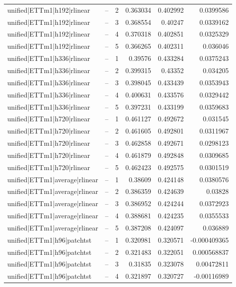 \begin{longtable}{llrrrr}
unified|ETTm1|h192|rlinear & -- & 2 & 0.363034 & 0.402992 & 0.0399586 \\
unified|ETTm1|h192|rlinear & -- & 3 & 0.368554 & 0.40247 & 0.0339162 \\
unified|ETTm1|h192|rlinear & -- & 4 & 0.370318 & 0.402851 & 0.0325329 \\
unified|ETTm1|h192|rlinear & -- & 5 & 0.366265 & 0.402311 & 0.036046 \\
unified|ETTm1|h336|rlinear & -- & 1 & 0.39576 & 0.433284 & 0.0375243 \\
unified|ETTm1|h336|rlinear & -- & 2 & 0.399315 & 0.43352 & 0.034205 \\
unified|ETTm1|h336|rlinear & -- & 3 & 0.398045 & 0.433439 & 0.0353943 \\
unified|ETTm1|h336|rlinear & -- & 4 & 0.400631 & 0.433576 & 0.0329442 \\
unified|ETTm1|h336|rlinear & -- & 5 & 0.397231 & 0.433199 & 0.0359683 \\
unified|ETTm1|h720|rlinear & -- & 1 & 0.461127 & 0.492672 & 0.031545 \\
unified|ETTm1|h720|rlinear & -- & 2 & 0.461605 & 0.492801 & 0.0311967 \\
unified|ETTm1|h720|rlinear & -- & 3 & 0.462858 & 0.492671 & 0.0298123 \\
unified|ETTm1|h720|rlinear & -- & 4 & 0.461879 & 0.492848 & 0.0309685 \\
unified|ETTm1|h720|rlinear & -- & 5 & 0.462423 & 0.492575 & 0.0301519 \\
unified|ETTm1|average|rlinear & -- & 1 & 0.38609 & 0.424148 & 0.0380576 \\
unified|ETTm1|average|rlinear & -- & 2 & 0.386359 & 0.424639 & 0.03828 \\
unified|ETTm1|average|rlinear & -- & 3 & 0.386952 & 0.424244 & 0.0372923 \\
unified|ETTm1|average|rlinear & -- & 4 & 0.388681 & 0.424235 & 0.0355533 \\
unified|ETTm1|average|rlinear & -- & 5 & 0.387208 & 0.424097 & 0.036889 \\
unified|ETTm1|h96|patchtst & -- & 1 & 0.320981 & 0.320571 & -0.000409365 \\
unified|ETTm1|h96|patchtst & -- & 2 & 0.321483 & 0.322051 & 0.000568837 \\
unified|ETTm1|h96|patchtst & -- & 3 & 0.31835 & 0.323078 & 0.00472811 \\
unified|ETTm1|h96|patchtst & -- & 4 & 0.321897 & 0.320727 & -0.00116989 \\

\end{longtable}
